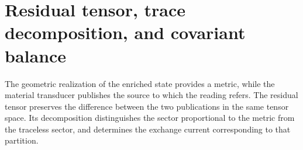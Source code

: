 %

\section{Residual tensor, trace decomposition, and covariant balance}
\label{vii:vii:sec:tensor-residual-balance}

The geometric realization of the enriched state provides a metric,
while the material transducer publishes the source to which the
reading refers. The residual tensor preserves the difference between the two publications
in the same tensor space. Its decomposition distinguishes the
sector proportional to the metric from the traceless sector, and determines
the exchange current corresponding to that partition.

